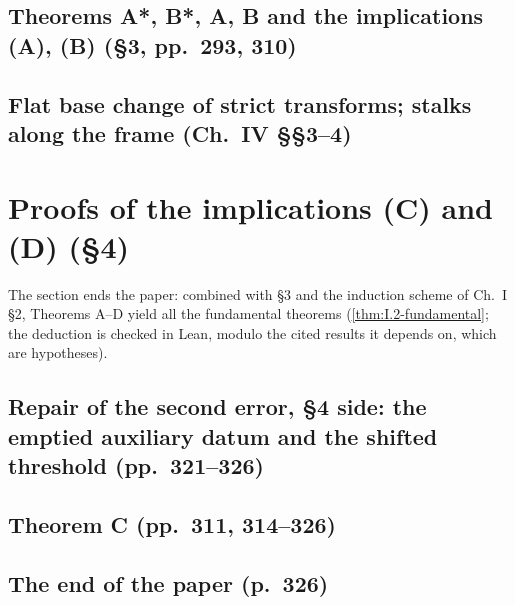 
\subsection*{Theorems A*, B*, A, B and the implications (A), (B) (\S3, pp.~293, 310)}


\subsection*{Flat base change of strict transforms; stalks along the frame (Ch.~IV \S\S3--4)}



\section{Proofs of the implications (C) and (D) (\S4)}

The section ends the paper: combined with \S3 and the induction scheme of Ch.~I \S2, Theorems
A--D yield all the fundamental theorems (\cref{thm:I.2-fundamental}; the deduction is checked
in Lean, modulo the cited results it depends on, which are hypotheses).


\subsection*{Repair of the second error, \S4 side: the emptied auxiliary datum and the shifted threshold (pp.~321--326)}


\subsection*{Theorem C (pp.~311, 314--326)}


\subsection*{The end of the paper (p.~326)}

